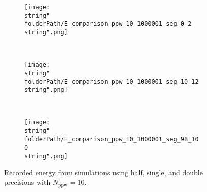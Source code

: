 \begin{minipage}[t]{.5\textwidth}
%
\begin{figure}[H]
\captionsetup{width=0.95\textwidth,font=footnotesize,labelfont=footnotesize}
\centering
%
\begin{subfigure}[b]{1\textwidth}
%
\centering\texttt{[image: \\string"\\folderPath/E\_comparison\_ppw\_10\_1000001\_seg\_0\_2\\string".png]}
%
\end{subfigure}\hfill
\\[2ex]
%
\begin{subfigure}[b]{1\textwidth}
%
\centering\texttt{[image: \\string"\\folderPath/E\_comparison\_ppw\_10\_1000001\_seg\_10\_12\\string".png]}
%
\end{subfigure}\hfill
\\[2ex]
%
\begin{subfigure}[b]{1\textwidth}
%
\centering\texttt{[image: \\string"\\folderPath/E\_comparison\_ppw\_10\_1000001\_seg\_98\_100\\string".png]}
%
\end{subfigure}\hfill
%
\caption{Recorded energy from simulations using half, single, and double precisions with $N_\text{ppw}=10$.}
\label{comparison_E_half_compensated_segments_ppw_10_slow2sum}
\end{figure}
%
\end{minipage}


\renewcommand{\folderPath}{\string"/dev/null\string"}